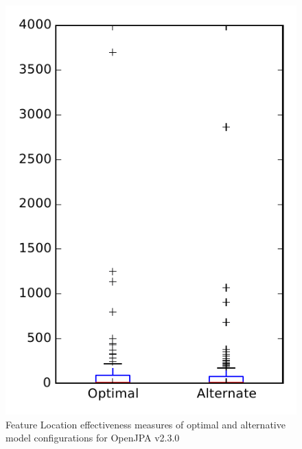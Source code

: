
\begin{figure}
\centering
\includegraphics[height=0.4\textheight]{figures/combo/flt_rq1_openjpa}
\caption{Feature Location effectiveness measures of optimal and alternative model configurations for OpenJPA v2.3.0}
\label{fig:combo:flt:rq1:openjpa}
\end{figure}
